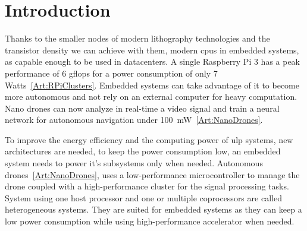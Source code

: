 
\chapter{Introduction}

    Thanks to the smaller nodes of modern lithography technologies and the transistor density we can achieve with them, modern \glspl{cpu} in embedded systems, as capable enough to be used in datacenters. A single Raspberry Pi 3 has a peak performance of 6 \glspl{gflop} for a power consumption of only 7 Watts~\ref{Art:RPiClusters}.
    Embedded systems can take advantage of it to become more autonomous and not rely on an external computer for heavy computation. Nano drones can now analyze in real-time a video signal and train a neural network for autonomous navigation under \si{100 mW}~\ref{Art:NanoDrones}.

    To improve the energy efficiency and the computing power of \gls{ulp} systems, new architectures are needed, to keep the power consumption low, an embedded system needs to power it's subsystems only when needed. Autonomous drones~\ref{Art:NanoDrones}, uses a low-performance microcontroller to manage the drone coupled with a high-performance cluster for the signal processing tasks. System using one host processor and one or multiple coprocessors are called heterogeneous systems. They are suited for embedded systems as they can keep a low power consumption while using high-performance accelerator when needed.

